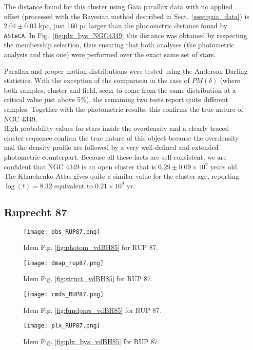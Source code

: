 \documentclass[draft]{aa}
\begin{document}
The distance found for this cluster using Gaia parallax data with no applied
offset (processed with the Bayesian method described in
Sect.~\ref{ssec:gaia_data}) is $2.04\pm0.03$ kpc, just 160 pc
larger than the photometric distance found by \texttt{ASteCA}.
In Fig.~\ref{fig:plx_bys_NGC4349}  this distance was obtained
by respecting the membership selection, thus ensuring that both analyses 
(the photometric analysis and this one) were performed over the exact same set
of stars.

Parallax and proper motion distributions were tested using the Anderson-Darling
statistics. With the exception of the comparison in the case of $PM(\delta)$
(where both samples, cluster and field, seem to come from the same distribution
at a critical value just above 5\%), the remaining two tests report quite
different samples. Together with the photometric results, this confirms the true
nature of NGC 4349.\\

High probability values for stars inside the overdensity and a clearly traced
cluster sequence confirm the true nature of this object because the overdensity
and the density profile are followed by a very well-defined and extended
photometric counterpart.
Because all these facts are self-consistent, we are confident that NGC 4349 is
an open cluster that is $0.29\pm0.09\times10^9$ years old.
The Kharchenko Atlas gives quite a similar value for the cluster age, reporting
$\log(t)=8.32$ equivalent to $0.21\times10^9$ yr.




\subsection{Ruprecht 87}

\begin{figure*}[ht]
    \centering
    \texttt{[image: obs\_RUP87.png]}
    \caption{Idem Fig. \ref{fig:photom_vdBH85} for RUP 87.}
    \label{fig:photom_RUP87}
\end{figure*}
\begin{figure*}[ht]
    \centering
    \texttt{[image: dmap\_rup87.png]}
    \caption{Idem Fig. \ref{fig:struct_vdBH85} for RUP 87.}
    \label{fig:struct_RUP87}
\end{figure*}
\begin{figure*}[ht]
    \centering
    \texttt{[image: cmds\_RUP87.png]}
    \caption{Idem Fig. \ref{fig:fundpars_vdBH85} for RUP 87.}
    \label{fig:fundpars_RUP87}
\end{figure*}
\begin{figure*}[ht]
    \centering
    \texttt{[image: plx\_RUP87.png]}
    \caption{Idem Fig. \ref{fig:plx_bys_vdBH85} for RUP 87.}
    \label{fig:plx_bys_RUP87}
\end{figure*}
\end{document}
